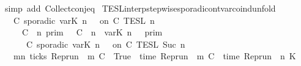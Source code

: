 \begin{isabellebody}
\ {\isacharparenleft}simp\ add{\isacharcolon}\ Collect{\isacharunderscore}conj{\isacharunderscore}eq{\isacharparenright}%
\endisatagproof
{\isafoldproof}%
%
\isadelimproof
\isanewline
%
\endisadelimproof
\isanewline
{}\isamarkupfalse%
\ TESL{\isacharunderscore}interp{\isacharunderscore}stepwise{\isacharunderscore}sporadicon{\isacharunderscore}tvar{\isacharunderscore}coind{\isacharunderscore}unfold{\isacharcolon}\isanewline
\ \ {\isacartoucheopen}{\isasymlbrakk}\ C\ sporadic{\isasymsharp}\ {\isasymlparr}{\isasymtau}\isactrlsub v\isactrlsub a\isactrlsub r{\isacharparenleft}K{\isacharcomma}\ n{\isacharprime}{\isacharparenright}\ {\isasymoplus}\ {\isasymtau}{\isasymrparr}\ on\ C\ {\isasymrbrakk}\isactrlsub T\isactrlsub E\isactrlsub S\isactrlsub L\isactrlbsup {\isasymge}\ n\isactrlesup \ {\isacharequal}\isanewline
\ \ \ \ {\isasymlbrakk}\ C\ {\isasymUp}\ n\ {\isasymrbrakk}\isactrlsub p\isactrlsub r\isactrlsub i\isactrlsub m\ {\isasyminter}\ {\isasymlbrakk}\ C\ {\isasymDown}\ n\ {\isacharat}{\isasymsharp}\ {\isasymlparr}{\isasymtau}\isactrlsub v\isactrlsub a\isactrlsub r{\isacharparenleft}K{\isacharcomma}\ n{\isacharprime}{\isacharparenright}\ {\isasymoplus}\ {\isasymtau}{\isasymrparr}\ {\isasymrbrakk}\isactrlsub p\isactrlsub r\isactrlsub i\isactrlsub m\isanewline
\ \ \ \ {\isasymunion}\ {\isasymlbrakk}\ C\ sporadic{\isasymsharp}\ {\isasymlparr}{\isasymtau}\isactrlsub v\isactrlsub a\isactrlsub r{\isacharparenleft}K{\isacharcomma}\ n{\isacharprime}{\isacharparenright}\ {\isasymoplus}\ {\isasymtau}{\isasymrparr}\ on\ C\ {\isasymrbrakk}\isactrlsub T\isactrlsub E\isactrlsub S\isactrlsub L\isactrlbsup {\isasymge}\ Suc\ n\isactrlesup {\isacartoucheclose}\isanewline
%
\isadelimproof
%
\endisadelimproof
%
\isatagproof
{}\isamarkupfalse%
\ {\isacharminus}\isanewline
\ \ \isamarkupfalse%
\ {\isacartoucheopen}{\isacharbraceleft}\ {\isasymrho}{\isachardot}\ {\isasymexists}m{\isasymge}n{\isachardot}\ ticks\ {\isacharparenleft}{\isacharparenleft}Rep{\isacharunderscore}run\ {\isasymrho}{\isacharparenright}\ m\ C\ {\isacharequal}\ True\ {\isasymand}\ time\ {\isacharparenleft}{\isacharparenleft}Rep{\isacharunderscore}run\ {\isasymrho}{\isacharparenright}\ m\ C\ {\isacharequal}\ time\ {\isacharparenleft}{\isacharparenleft}Rep{\isacharunderscore}run\ {\isasymrho}{\isacharparenright}\ n{\isacharprime}\ K{\isacharparenright}\ {\isacharplus}\ {\isasymtau}\ {\isacharbraceright}\isanewline

\end{isabellebody}
